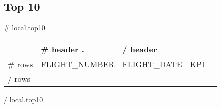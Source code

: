 
\subsection{Top 10}

{{# local.top10}}
\begin{center}
\begin{tabular}{l|l|l|r|l}
\hline
\rowcolor{palette1light} &
{{# header}}
{{.}} &
{{/ header}} \\
\hline
{{# rows}}
&
{{FLIGHT_NUMBER}} &
{{FLIGHT_DATE}} &
{{KPI}} & \\
{{/ rows}}
\hline
\end{tabular}
\end{center}
{{/ local.top10}}
